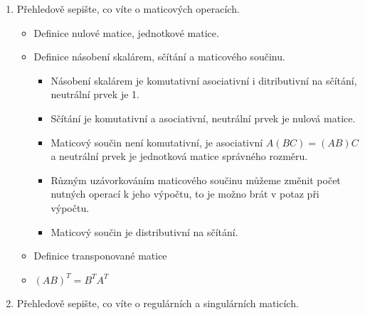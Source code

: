 \documentclass[10pt,a4paper]{article}
\begin{document}
\begin{enumerate}
\begin{itemize}[label=$\circ$]
\begin{itemize}
Důkaz triviální.
\item $A\overline{x} = 0$ a $Ax^0 = b \implies A(\overline{x} + x^0) = b$ 
\end{itemize}


\item Věta: Nechť $Ax^0 = b$, potom $f: \overline{x} \to \overline{x} + x^0$ je bijekcí množiny řešení $Ax = 0$ 
\begin{proof}
Nechť $g: x \to x - x^0:$ 

$g \circ f = id$ možných řešení homogenní soustavy.

$f \circ g = id$ možných řešení heterogenní soustavy.

$\implies f$ je bijekce.  
\end{proof}

Důsledek: Každé řešení $Ax =b$ lze zapsat jako $x^0 +p_1\overline{x}_1 + ... + p_{n-rank}\overline{x}_{n-rank}$


\end{itemize}

\item Přehledově sepište, co víte o maticových operacích.

\begin{itemize}[label=$\circ$]
\item Definice nulové matice, jednotkové matice.
\item Definice násobení skalárem, sčítání a maticového součinu.
\begin{itemize}
\item Násobení skalárem je komutativní asociativní i ditributivní na sčítání, neutrální prvek je 1.
\item Sčítání je komutativní a asociativní, neutrální prvek je nulová matice.
\item Maticový součin není komutativní, je asociativní $A(BC) = (AB)C$a neutrální prvek je jednotková matice správného rozměru.
\item Různým uzávorkováním maticového součinu můžeme změnit počet nutných operací k jeho výpočtu, to je možno brát v potaz při výpočtu.
\item Maticový součin je distributivní na sčítání.
\end{itemize}
\item Definice transponované matice

\item $(AB)^T = B^T A^T$
\end{itemize}

\item Přehledově sepište, co víte o regulárních a singulárních maticích. 


\end{enumerate}
\end{document}

